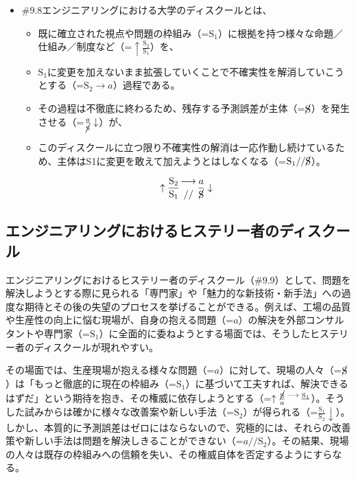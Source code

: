 \begin{note}{}
  \begin{itemize}
    \tightlist
    \item{\#9.8}エンジニアリングにおける大学のディスクールとは、
      \begin{itemize}
        \tightlist
        \item 既に確立された視点や問題の枠組み（=$\textrm{S}_1$）に根拠を持つ様々な命題／仕組み／制度など（=$\uparrow\frac{\textrm{S}_2}{\textrm{S}_1}$）を、
        \item $\textrm{S}_1$に変更を加えないまま拡張していくことで不確実性を解消していこうとする（=$\textrm{S}_2\rightarrow a$）過程である。
        \item その過程は不徹底に終わるため、残存する予測誤差が主体（=$\cancel{\textrm{S}}$）を発生させる（=$\frac{a}{\cancel{\textrm{S}}}\downarrow$）が、
        \item このディスクールに立つ限り不確実性の解消は一応作動し続けているため、主体はS1に変更を敢えて加えようとはしなくなる（=$\textrm{S}_1//\cancel{\textrm{S}}$）。
      \end{itemize}

$$
\uparrow\frac{\mathrm{S_2}}{\mathrm{S_1}}\genfrac{}{}{0pt}{}{\longrightarrow}{//}\frac{a}{\cancel{\textrm{S}}}\downarrow
$$
  \end{itemize}
\end{note}

\subsection{エンジニアリングにおけるヒステリー者のディスクール}\label{ux30a8ux30f3ux30b8ux30cbux30a2ux30eaux30f3ux30b0ux306bux304aux3051ux308bux30d2ux30b9ux30c6ux30eaux30fcux8005ux306eux30c7ux30a3ux30b9ux30afux30fcux30eb}

エンジニアリングにおけるヒステリー者のディスクール（\#9.9）として、問題を解決しようとする際に見られる「専門家」や「魅力的な新技術・新手法」への過度な期待とその後の失望のプロセスを挙げることができる。例えば、工場の品質や生産性の向上に悩む現場が、自身の抱える問題（=\(a\)）の解決を外部コンサルタントや専門家（=\(\textrm{S}_1\)）に全面的に委ねようとする場面では、そうしたヒステリー者のディスクールが現れやすい。

その場面では、生産現場が抱える様々な問題（=\(a\)）に対して、現場の人々（=\(\cancel{\textrm{S}}\)）は「もっと徹底的に現在の枠組み（=\(\textrm{S}_1\)）に基づいて工夫すれば、解決できるはずだ」という期待を抱き、その権威に依存しようとする（=\(\uparrow\frac{\cancel{\textrm{S}}}{a}\genfrac{}{}{0pt}{}{\longrightarrow}{}\frac{\textrm{S}_1}{}\)）。そうした試みからは確かに様々な改善案や新しい手法（=\(\textrm{S}_2\)）が得られる（=\(\frac{\textrm{S}_1}{\textrm{S}_2}\downarrow\)）。しかし、本質的に予測誤差はゼロにはならないので、究極的には、それらの改善策や新しい手法は問題を解決しきることができない（=\(a//\textrm{S}_2\)）。その結果、現場の人々は既存の枠組みへの信頼を失い、その権威自体を否定するようにすらなる。

